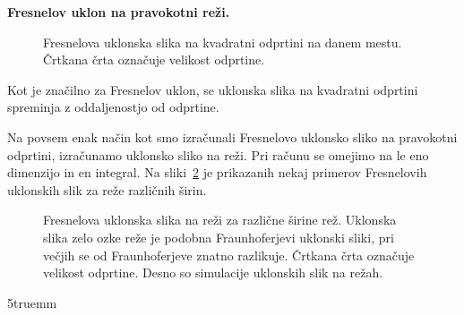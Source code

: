 \begin{example}{\bf Fresnelov uklon na pravokotni reži.}
\begin{figure}[ht]
\caption{Fresnelova uklonska slika na kvadratni odprtini na danem mestu. 
Črtkana črta označuje velikost odprtine.}
\label{fig:05_FrKv}
\end{figure}
Kot je značilno za Fresnelov uklon, se uklonska slika na kvadratni odprtini spreminja
z oddaljenostjo od odprtine. 

Na povsem enak način kot smo izračunali Fresnelovo uklonsko sliko na pravokotni odprtini,
izračunamo uklonsko sliko na reži. Pri računu se omejimo
na le eno dimenzijo in en integral. Na sliki~\ref{fig:05_FrReza} je prikazanih nekaj 
primerov Fresnelovih uklonskih slik za reže različnih širin. 
\begin{figure}[!h]
\centering
\def\svgwidth{140truemm} 

\caption{Fresnelova uklonska slika na reži za različne širine rež. Uklonska slika
zelo ozke reže je podobna Fraunhoferjevi uklonski sliki, pri večjih se od Fraunhoferjeve 
znatno razlikuje. Črtkana črta označuje velikost odprtine. Desno so simulacije uklonskih
slik na režah.}
\label{fig:05_FrReza}
\end{figure}
\vglue5truemm

\end{example}

